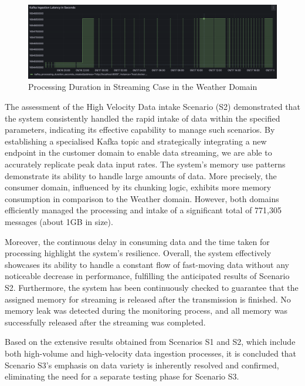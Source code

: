 \documentclass[preprint,12pt]{elsarticle}
\begin{document}
\begin{figure}[h]
  \centering
  \includegraphics[width=\textwidth]{images/processing-duration-streaming-case-in-weather-domain.png}
  \caption{Processing Duration in Streaming Case in the Weather Domain}
  \label{processingDurationInStreamingCaseInWeatherDomain}
\end{figure}


The assessment of the High Velocity Data intake Scenario (S2) demonstrated that the system consistently handled the rapid intake of data within the specified parameters, indicating its effective capability to manage such scenarios. By establishing a specialised Kafka topic and strategically integrating a new endpoint in the customer domain to enable data streaming, we are able to accurately replicate peak data input rates. The system's memory use patterns demonstrate its ability to handle large amounts of data. More precisely, the consumer domain, influenced by its chunking logic, exhibits more memory consumption in comparison to the Weather domain. However, both domains efficiently managed the processing and intake of a significant total of 771,305 messages (about 1GB in size). 


Moreover, the continuous delay in consuming data and the time taken for processing highlight the system's resilience. Overall, the system effectively showcases its ability to handle a constant flow of fast-moving data without any noticeable decrease in performance, fulfilling the anticipated results of Scenario S2. Furthermore, the system has been continuously checked to guarantee that the assigned memory for streaming is released after the transmission is finished. No memory leak was detected during the monitoring process, and all memory was successfully released after the streaming was completed.

Based on the extensive results obtained from Scenarios S1 and S2, which include both high-volume and high-velocity data ingestion processes, it is concluded that Scenario S3's emphasis on data variety is inherently resolved and confirmed, eliminating the need for a separate testing phase for Scenario S3.
\end{document}
